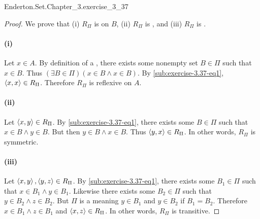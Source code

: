 \documentclass{report}
\begin{document}
    {Enderton.Set.Chapter\_3.exercise\_3\_37}

  \begin{proof}
    We prove that (i) $R_\Pi$ is  on $B$, (ii) $R_\Pi$ is
      , and (iii) $R_\Pi$ is .

    \paragraph{(i)}%

      Let $x \in A$.
      By definition of a , there exists some nonempty set
        $B \in \Pi$ such that $x \in B$.
      Thus $(\exists B \in \Pi)(x \in B \land x \in B)$.
      By \eqref{sub:exercise-3.37-eq1}, $\left< x, x \right> \in R_\Pi$.
      Therefore $R_\Pi$ is reflexive on $A$.

    \paragraph{(ii)}%

      Let $\left< x, y \right> \in R_\Pi$.
      By \eqref{sub:exercise-3.37-eq1}, there exists some $B \in \Pi$ such that
        $x \in B \land y \in B$.
      But then $y \in B \land x \in B$.
      Thus $\left< y, x \right> \in R_\Pi$.
      In other words, $R_\Pi$ is symmetric.

    \paragraph{(iii)}%

      Let $\left< x, y \right>, \left< y, z \right> \in R_\Pi$.
      By \eqref{sub:exercise-3.37-eq1}, there exists some $B_1 \in \Pi$ such that
        $x \in B_1 \land y \in B_1$.
      Likewise there exists some $B_2 \in \Pi$ such that
        $y \in B_2 \land z \in B_2$.
      But $\Pi$ is a  meaning $y \in B_1$ and $y \in B_2$
        if $B_1 = B_2$.
      Therefore $x \in B_1 \land z \in B_1$ and $\left< x, z \right> \in R_\Pi$.
      In other words, $R_\Pi$ is transitive.

  \end{proof}

\subsection{}%
\end{document}
